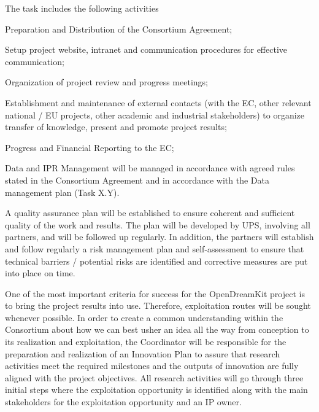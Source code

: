 \begin{workpackage}
\begin{tasklist}
\begin{task}[title=Project and financial management,
id=project-finance-management,lead=PS,PM=33]
The task includes the following activities
  \begin{compactitem}
  \item Preparation and Distribution of the
    Consortium Agreement;
  \item Setup project website, intranet and
    communication procedures for effective communication;
  \item
    Organization of project review and progress meetings;
  \item
    Establishment and maintenance of external contacts (with the EC,
    other relevant national / EU projects, other academic and
    industrial stakeholders) to organize transfer of knowledge,
    present and
promote project results;
  \item Progress and Financial Reporting to the EC;
  \item Data and IPR Management will be managed in accordance with agreed rules stated in the
Consortium Agreement and in accordance with the Data management plan (Task X.Y).
  \end{compactitem}
\end{task}

\begin{task}[title=Quality assurance and risk management,id=project-finance-management,lead=PS,PM=15]
A quality assurance plan will be established to ensure coherent and sufficient quality of the work
and results. The plan will be developed by UPS, involving all partners, and will be followed up
regularly. In addition, the partners will establish and follow regularly a risk management plan
and self-assessment to ensure that technical barriers / potential risks are identified  and corrective measures are put into place on time.
\end{task}

\begin{task}[title=Innovation management,
id=project-finance-management,lead=PS,PM=10]

One of the most important criteria for success for the OpenDreamKit project is to bring the project results into use. Therefore, exploitation routes will be sought whenever possible. In
order to create a common understanding within the Consortium about how we can best usher
an idea all the way from conception to its realization and exploitation, the Coordinator will be responsible for
the preparation and realization of an Innovation Plan to assure that research activities meet the
required milestones and the outputs of innovation are fully aligned with the project objectives.
All research activities will go through three initial steps where the exploitation opportunity is
identified along with the main stakeholders for the exploitation opportunity and an IP owner.
\end{task}
\end{tasklist}


\end{workpackage}
